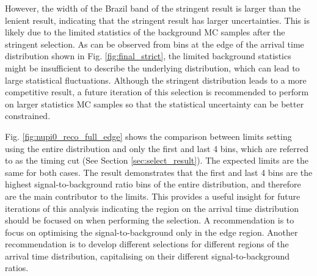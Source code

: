 However, the width of the Brazil band of the stringent result is larger than the lenient result, indicating that the stringent result has larger uncertainties.
This is likely due to the limited statistics of the background MC samples after the stringent selection.
As can be observed from bins at the edge of the arrival time distribution shown in Fig. \ref{fig:final_strict}, the limited background statistics might be insufficient to describe the underlying distribution, which can lead to large statistical fluctuations.                                  
Although the stringent distribution leads to a more competitive result, a future iteration of this selection is recommended to perform on larger statistics MC samples so that the statistical uncertainty can be better constrained.

Fig. \ref{fig:nupi0_reco_full_edge} shows the comparison between limits setting using the entire distribution and only the first and last 4 bins, which are referred to as the timing cut (See Section \ref{sec:select_result}). 
The expected limits are the same for both cases.
The result demonstrates that the first and last 4 bins are the highest signal-to-background ratio bins of the entire distribution, and therefore are the main contributor to the limits.
This provides a useful insight for future iterations of this analysis indicating the region on the arrival time distribution should be focused on when performing the selection.
A recommendation is to focus on optimising the signal-to-background only in the edge region.
Another recommendation is to develop different selections for different regions of the arrival time distribution, capitalising on their different signal-to-background ratios.

